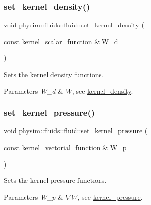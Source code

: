 \subsubsection{\texorpdfstring{set\+\_\+kernel\+\_\+density()}{set\_kernel\_density()}}
{\footnotesize\ttfamily void physim\+::fluids\+::fluid\+::set\+\_\+kernel\+\_\+density (\begin{DoxyParamCaption}\item[{const \hyperlink{namespacephysim_1_1fluids_a22c55c76ab3fe3de79dada15e2f9c2d6}{kernel\+\_\+scalar\+\_\+function} \&}]{W\+\_\+d }\end{DoxyParamCaption})}



Sets the kernel density functions. 


\begin{DoxyParams}{Parameters}
{\em W\+\_\+d} & $W$, see \hyperlink{classphysim_1_1fluids_1_1fluid_a8774f815e80bb81ddc14890fee13bffc}{kernel\+\_\+density}. \\
\hline
\end{DoxyParams}
\mbox{\label{classphysim_1_1fluids_1_1fluid_ad7cbaf969b9c5e4c75606e2f84b81e69}} 
\subsubsection{\texorpdfstring{set\+\_\+kernel\+\_\+pressure()}{set\_kernel\_pressure()}}
{\footnotesize\ttfamily void physim\+::fluids\+::fluid\+::set\+\_\+kernel\+\_\+pressure (\begin{DoxyParamCaption}\item[{const \hyperlink{namespacephysim_1_1fluids_ab109a55050c62abe9c1c23924f620754}{kernel\+\_\+vectorial\+\_\+function} \&}]{W\+\_\+p }\end{DoxyParamCaption})}



Sets the kernel pressure functions. 


\begin{DoxyParams}{Parameters}
{\em W\+\_\+p} & $\nabla W$, see \hyperlink{classphysim_1_1fluids_1_1fluid_ae3ccfb94b27e6a1464210d36744f16a4}{kernel\+\_\+pressure}. \\
\hline
\end{DoxyParams}
\mbox{\label{classphysim_1_1fluids_1_1fluid_a57d90a54268e6c204e0173f81a678dd6}} 
